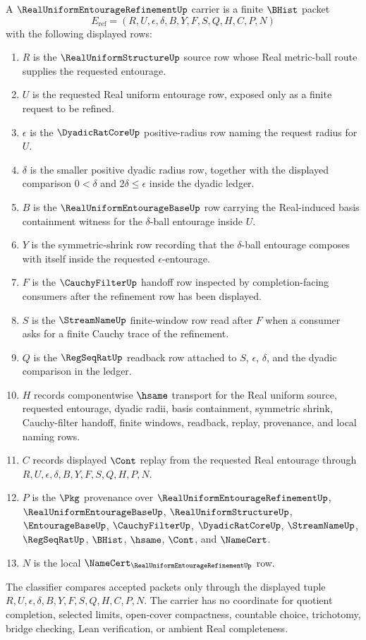 \begin{definition}
\label{def:real-uniform-entourage-refinement-carrier}
A $\RealUniformEntourageRefinementUp$ carrier is a finite $\BHist$ packet
$$
E_{\mathrm{ref}}=(R,U,\epsilon,\delta,B,Y,F,S,Q,H,C,P,N)
$$
with the following displayed rows:
\begin{enumerate}
\item $R$ is the $\RealUniformStructureUp$ source row whose Real metric-ball route supplies the requested entourage.
\item $U$ is the requested Real uniform entourage row, exposed only as a finite request to be refined.
\item $\epsilon$ is the $\DyadicRatCoreUp$ positive-radius row naming the request radius for $U$.
\item $\delta$ is the smaller positive dyadic radius row, together with the displayed comparison $0<\delta$ and $2\delta\leq\epsilon$ inside the dyadic ledger.
\item $B$ is the $\RealUniformEntourageBaseUp$ row carrying the Real-induced basis containment witness for the $\delta$-ball entourage inside $U$.
\item $Y$ is the symmetric-shrink row recording that the $\delta$-ball entourage composes with itself inside the requested $\epsilon$-entourage.
\item $F$ is the $\CauchyFilterUp$ handoff row inspected by completion-facing consumers after the refinement row has been displayed.
\item $S$ is the $\StreamNameUp$ finite-window row read after $F$ when a consumer asks for a finite Cauchy trace of the refinement.
\item $Q$ is the $\RegSeqRatUp$ readback row attached to $S$, $\epsilon$, $\delta$, and the dyadic comparison in the ledger.
\item $H$ records componentwise $\hsame$ transport for the Real uniform source, requested entourage, dyadic radii, basis containment, symmetric shrink, Cauchy-filter handoff, finite windows, readback, replay, provenance, and local naming rows.
\item $C$ records displayed $\Cont$ replay from the requested Real entourage through $R,U,\epsilon,\delta,B,Y,F,S,Q,H,P,N$.
\item $P$ is the $\Pkg$ provenance over $\RealUniformEntourageRefinementUp$, $\RealUniformEntourageBaseUp$, $\RealUniformStructureUp$, $\EntourageBaseUp$, $\CauchyFilterUp$, $\DyadicRatCoreUp$, $\StreamNameUp$, $\RegSeqRatUp$, $\BHist$, $\hsame$, $\Cont$, and $\NameCert$.
\item $N$ is the local $\NameCert_{\RealUniformEntourageRefinementUp}$ row.
\end{enumerate}
The classifier compares accepted packets only through the displayed tuple $R,U,\epsilon,\delta,B,Y,F,S,Q,H,C,P,N$. The carrier has no coordinate for quotient completion, selected limits, open-cover compactness, countable choice, trichotomy, bridge checking, Lean verification, or ambient Real completeness.
\end{definition}

